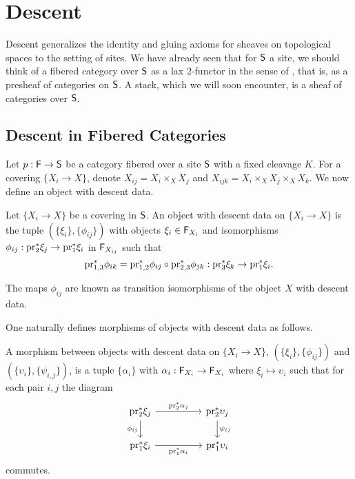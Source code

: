 \section{Descent}\label{sec: descent}
Descent generalizes the identity and gluing axioms for sheaves on topological spaces to the setting of sites. We have already seen that for $\mathsf{S}$ a site, we should think of a fibered category over $\mathsf{S}$ as a lax 2-functor in the sense of , that is, as a presheaf of categories on $\mathsf{S}$. A stack, which we will soon encounter, is a sheaf of categories over $\mathsf{S}$. 
\subsection{Descent in Fibered Categories}\label{subsec: descent in fibered categories}
Let $p:\mathsf{F}\to\mathsf{S}$ be a category fibered over a site $\mathsf{S}$ with a fixed cleavage $K$. For a covering $\{X_{i}\to X\}$, denote $X_{ij}=X_{i}\times_{X}X_{j}$ and $X_{ijk}=X_{i}\times_{X}X_{j}\times_{X}X_{k}$. We now define an object with descent data. 
\begin{definition}\label{def: object w descent data}
    Let $\{X_{i}\to X\}$ be a covering in $\mathsf{S}$. An object with descent data on $\{X_{i}\to X\}$ is the tuple $(\{\xi_{i}\},\{\phi_{ij}\})$ with objects $\xi_{i}\in\mathsf{F}_{X_{i}}$ and isomorphisms $\phi_{ij}:\mathrm{pr}_{2}^{*}\xi_{j}\to\mathrm{pr}_{1}^{*}\xi_{i}$ in $\mathsf{F}_{X_{ij}}$ such that 
    $$\mathrm{pr}_{1,3}^{*}\phi_{ik}=\mathrm{pr}_{1,2}^{*}\phi_{ij}\circ\mathrm{pr}_{2,3}^{*}\phi_{jk}:\mathrm{pr}_{3}^{*}\xi_{k}\to\mathrm{pr}_{1}^{*}\xi_{i}.$$
\end{definition}
\begin{remark}
    The maps $\phi_{ij}$ are known as transition isomorphisms of the object $X$ with descent data. 
\end{remark}
One naturally defines morphisms of objects with descent data as follows. 
\begin{definition}
    A morphism between objects with descent data on $\{X_{i}\to X\}$, $(\{\xi_{i}\},\{\phi_{ij}\})$ and $(\{\upsilon_{i}\},\{\psi_{i,j}\})$, is a tuple $\{\alpha_{i}\}$ with $\alpha_{i}:\mathsf{F}_{X_{i}}\to\mathsf{F}_{X_{i}}$ where $\xi_{i}\mapsto\upsilon_{i}$ such that for each pair $i,j$ the diagram 
    $$%
    \begin{tikzcd}
        {\pr_{2}^{*}\xi_{j}} && {\pr_{2}^{*}\upsilon_{j}} \\
        {\pr_{1}^{*}\xi_{i}} && {\pr_{1}^{*}\upsilon_{i}}
        \arrow["{\pr_{1}^{*}\alpha_{i}}"', from=2-1, to=2-3]
        \arrow["{\psi_{ij}}", from=1-3, to=2-3]
        \arrow["{\phi_{ij}}"', from=1-1, to=2-1]
        \arrow["{\pr_{2}^{*}\alpha_{j}}", from=1-1, to=1-3]
    \end{tikzcd}$$
    commutes. 
\end{definition}

